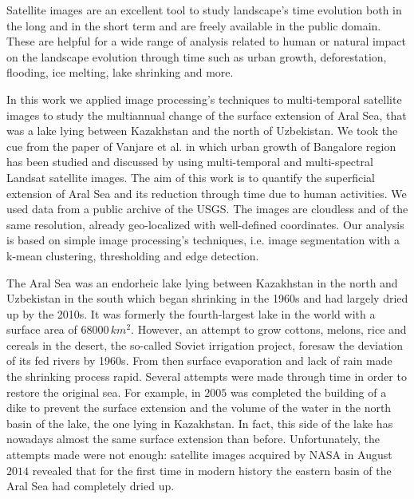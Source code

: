 Satellite images are an excellent tool to study landscape's time evolution both in the long and in the short term and are freely available in the public domain. 
These are helpful for a wide range of analysis related to human or natural impact on the landscape evolution through time such as urban growth, deforestation, flooding, ice melting, lake shrinking and more.

In this work we applied image processing's techniques to multi-temporal satellite images to study the multiannual change of the surface extension of Aral Sea, that was a lake lying between Kazakhstan and the north of Uzbekistan. 
We took the cue from the paper of Vanjare et al. \cite{satelliteImg} in which urban growth of Bangalore region has been studied and discussed by using multi-temporal and multi-spectral Landsat satellite images. 
The aim of this work is to quantify the superficial extension of Aral Sea and its reduction through time due to human activities.
We used data from a public archive of the USGS. 
The images are cloudless and of the same resolution, already geo-localized with well-defined coordinates. 
Our analysis is based on simple image processing's techniques, i.e. image segmentation with a k-mean clustering, thresholding and edge detection.

The Aral Sea was an endorheic lake lying between Kazakhstan in the north and Uzbekistan in the south which began shrinking in the 1960s and had largely dried up by the 2010s. 
It was formerly the fourth-largest lake in the world with a surface area of $68000\,km^2$.  
However, an attempt to grow cottons, melons, rice and cereals in the desert, the so-called Soviet irrigation project, foresaw the deviation of its fed rivers by 1960s. 
From then surface evaporation and lack of rain made the shrinking process rapid. Several attempts were made through time in order to restore the original sea.
For example, in $2005$ was completed the building of a dike to prevent the surface extension and the volume of the water in the north basin of the lake, the one lying in Kazakhstan. 
In fact, this side of the lake has nowadays almost the same surface extension than before. 
Unfortunately, the attempts made were not enough: satellite images acquired by NASA in August $2014$ revealed that for the first time in modern history the eastern basin of the Aral Sea had completely dried up.

